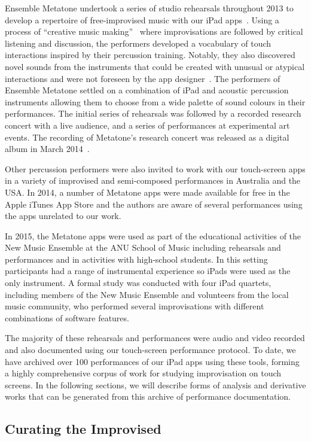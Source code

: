 \documentclass[graybox]{svmult}
\begin{document}
Ensemble Metatone undertook a series of studio rehearsals throughout
2013 to develop a repertoire of free-improvised music with our iPad
apps~\cite{Martin:2014jk}. Using a process of ``creative music
making''~\cite{Cahn:2005uq} where improvisations are followed by
critical listening and discussion, the performers developed a
vocabulary of touch interactions inspired by their percussion
training. Notably, they also discovered novel sounds from the
instruments that could be created with unusual or atypical
interactions and were not foreseen by the app
designer~\cite{Martin:2014cr}. The performers of Ensemble Metatone
settled on a combination of iPad and acoustic percussion instruments
allowing them to choose from a wide palette of sound colours in their
performances. The initial series of rehearsals was followed by a
recorded research concert with a live audience, and a series of
performances at experimental art events. The recording of Metatone's
research concert was released as a digital album in March
2014~\cite{Ensemble-Metatone:2014sf}.

Other percussion performers were also invited to work with our
touch-screen apps in a variety of improvised and semi-composed
performances in Australia and the USA. In 2014, a number of Metatone
apps were made available for free in the Apple iTunes App Store and
the authors are aware of several performances using the apps unrelated
to our work.

In 2015, the Metatone apps were used as part of the educational
activities of the New Music Ensemble at the ANU School of Music
including rehearsals and performances and in activities with
high-school students. In this setting participants had a range of
instrumental experience so iPads were used as the only instrument. A
formal study was conducted with four iPad quartets, including members
of the New Music Ensemble and volunteers from the local music
community, who performed several improvisations with different
combinations of software features.

The majority of these rehearsals and performances were audio and video
recorded and also documented using our touch-screen performance
protocol. To date, we have archived over 100 performances of our iPad
apps using these tools, forming a highly comprehensive corpus of work
for studying improvisation on touch screens. In the following
sections, we will describe forms of analysis and derivative works that
can be generated from this archive of performance documentation.

\subsection{Curating the Improvised}
\label{subsec:curating}
\end{document}
